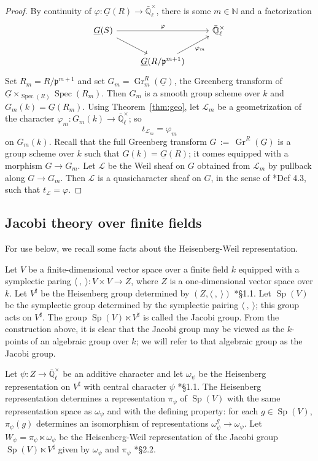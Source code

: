 \documentclass[10pt]{amsart}
\theoremstyle{plain}
\theoremstyle{definition}
\newcommand{\NN}{{\mathbb{N}}}
\newcommand{\EE}{\mathbb{\bar Q}_\ell}
\newcommand{\Fq}{k}
\newcommand{\EEx}{\EE^\times}
\DeclareMathOperator{\Gr}{Gr}
\newcommand{\Spec}[1]{{\operatorname{Spec}(#1)}}
\newcommand{\ceq}{{\, :=\, }}
\newcommand{\trFrob}[1]{t_{#1}}
\newcommand{\cs}[1]{{\mathcal{#1}}}
\newcommand{\Sp}{{\operatorname{Sp}}}
\begin{document}
\begin{proof}
By continuity of $\varphi : \underline{G}(R) \to \EE^\times$, there is some $m \in \NN$ and a factorization
\[
\begin{tikzcd}
\underline{G}(S) \arrow{rr}{\varphi} \arrow{rd} && \EEx\\
& \underline{G}(R/\mathfrak{p}^{m+1}) \arrow{ru}[swap]{\varphi_m} 
\end{tikzcd}
\] 
Set $R_m = R/\mathfrak{p}^{m+1}$ and
set $G_m = \Gr_m^{R}(\underline{G})$, the Greenberg transform of $\underline{G}\times_{\Spec{R}}\Spec{R_m}$.
Then $G_m$ is a smooth group scheme over $\Fq$ and $G_m(\Fq) = \underline{G}(R_m)$.
Using Theorem~\ref{thm:geo}, let $\cs{L}_m$ be a geometrization of the character $\varphi_m: G_m(\Fq) \to \EEx$; so
\[
\trFrob{\cs{L}_m} = \varphi_m
\]
on $G_m(\Fq)$.
%
Recall that the full Greenberg transform $G \ceq \Gr^{R}(\underline{G})$ is a group scheme over $\Fq$ such that $G(\Fq) = \underline{G}(R)$; it comes equipped with a morphism $G \to G_m$.
Let $\cs{L}$ be the  Weil sheaf on $G$ obtained from $\cs{L}_m$ by pullback along $G \to G_m$. 
Then $\cs{L}$ is a quasicharacter sheaf on $G$, in the sense of \cite{cunningham-roe:13a}*{Def 4.3}, such that $\trFrob{\cs{L}} = \varphi$.
\end{proof}

\subsection{Jacobi theory over finite fields}\label{ssec:Jacobi}

For use below, we recall some facts about the Heisenberg-Weil representation.

Let $V$ be a finite-dimensional vector space over a finite field $\Fq$ equipped with a symplectic paring $\langle\ ,\ \rangle : V\times V \to Z$, where $Z$ is a one-dimensional vector space over $\Fq$.
Let $V^\sharp$ be the Heisenberg group determined by $(Z, \langle\ ,\ \rangle)$ \cite{gurevich-hadani:07a}*{\S 1.1}.
Let $\Sp(V)$ be the symplectic group determined by the symplectic pairing $\langle\ ,\ \rangle$; this group acts on $V^\sharp$.
The group $\Sp(V)\ltimes V^\sharp$ is called the Jacobi group. 
From the construction above, it is clear that the Jacobi group may be viewed as the $\Fq$-points of an algebraic group over $\Fq$; we will refer to that algebraic group as the Jacobi group.

Let $\psi : Z \to \EEx$ be an additive character and let $\omega_\psi$ be the Heisenberg representation on $V^\sharp$ with central character $\psi$ \cite{gurevich-hadani:07a}*{\S 1.1}. 
The Heisenberg representation determines a representation $\pi_{\psi}$ of $\Sp(V)$ with the same representation space as $\omega_\psi$ and with the defining property: for each $g\in \Sp(V)$, $\pi_\psi(g)$ determines an isomorphism of representations $\omega_\psi^g \to \omega_\psi$.
Let $W_\psi = \pi_\psi \ltimes \omega_\psi$ be the Heisenberg-Weil representation of the Jacobi group $\Sp(V)\ltimes V^\sharp$ given by $\omega_\psi$ and $\pi_\psi$ \cite{gurevich-hadani:07a}*{\S 2.2}.
\end{document}

